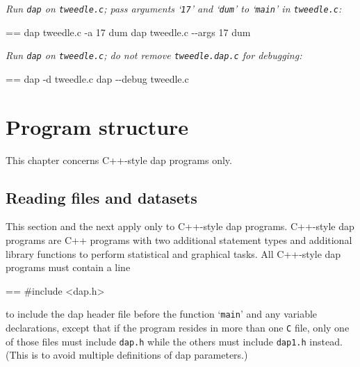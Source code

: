 \documentclass{book}
\makeatletter
\newenvironment{Texinfopreformatted}{%
  \par\GNUTobeylines\obeyspaces\frenchspacing\parskip=\z@\parindent=\z@}{}
{\catcode`\^^M=13 \gdef\GNUTobeylines{\catcode`\^^M=13 \def^^M{\null\par}}}
\newenvironment{Texinfoindented}{\begin{list}{}{}\item\relax}{\end{list}}
\renewcommand{\_}{\Texinfounderscore\discretionary{}{}{}}
\makeatother
\begin{document}
\emph{Run \texttt{dap} on \texttt{tweedle.c}; pass arguments `\texttt{17}'
and `\texttt{dum}' to `\texttt{main}' in \texttt{tweedle.c}:}
\begin{Texinfoindented}
\begin{Texinfopreformatted}%
\ttfamily dap tweedle.c -a 17 dum
dap tweedle.c {-}{-}args 17 dum
\end{Texinfopreformatted}
\end{Texinfoindented}

\emph{Run \texttt{dap} on \texttt{tweedle.c}; do not remove \texttt{tweedle.dap.c} for debugging:}
\begin{Texinfoindented}
\begin{Texinfopreformatted}%
\ttfamily dap -d tweedle.c
dap {-}{-}debug tweedle.c
\end{Texinfopreformatted}
\end{Texinfoindented}

\chapter{{Program structure}}
\label{anchor:Program-structure}%

This chapter concerns C++-style dap programs only.


\section{{Reading files and datasets}}
\label{anchor:Reading-files-and-datasets}%

%
%
This section and the next apply only to C++-style dap programs.
C++-style dap programs are C++ programs with two additional statement types
and additional library functions to perform statistical and graphical tasks.
All C++-style dap programs must contain a line

\begin{Texinfoindented}
\begin{Texinfopreformatted}%
\ttfamily \#include <dap.h>
\end{Texinfopreformatted}
\end{Texinfoindented}
\noindent{}to include the dap header file
%
%
before the function `\texttt{main}' and any variable declarations, except that
if the program resides in more than one \texttt{C} file, only one of those
files must include \texttt{dap.h} while the others must include \texttt{dap1.h} instead.
%
(This is to avoid multiple definitions
%
of dap parameters.)
\end{document}
